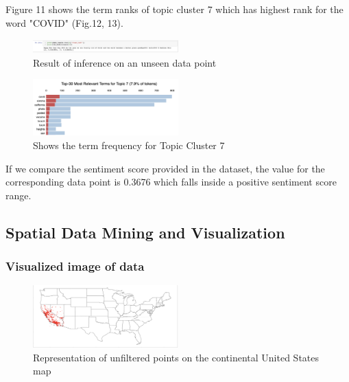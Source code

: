 Figure 11 shows the term ranks of topic cluster 7 which has highest rank for
the word "COVID" (Fig.12, 13).
\begin{figure}[H]
    \centering
    \includegraphics[width=0.5\textwidth]{imgs/infer.png}
    \caption{Result of inference on an unseen data point}
    \label{fig:infer}
\end{figure}
\begin{figure}[H]
    \centering
    \includegraphics[width=0.5\textwidth]{imgs/cluster_7.png}
    \caption{Shows the term frequency for Topic Cluster 7}
    \label{fig:my_label}
\end{figure}
If we compare the sentiment score provided in the dataset, the value for the
corresponding data point is 0.3676 which falls inside a positive sentiment
score range.

\subsection{Spatial Data Mining and Visualization}
\subsubsection{Visualized image of data}
\begin{figure}[h]
\centering
\includegraphics[width=0.5\textwidth]{imgs/USA.png}
\caption{\label{fig:Research process}Representation of unfiltered points on
 the continental United States map}
\end{figure}

